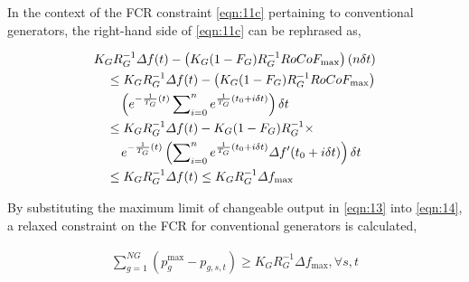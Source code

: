 \documentclass[lettersize,journal]{IEEEtran}
\begin{document}
In the context of the FCR constraint \eqref{eqn:11c} pertaining to conventional generators, the right-hand side of \eqref{eqn:11c} can be rephrased as,

\vspace{-0.125in}
\begin{small}
	\begin{align}\label{eqn:13}
		 & {{K_{G} }{ R_{G}^{-1}} \varDelta f(t) -  \left({K_G(1-F_G)}{ R_{G}^{-1} }RoCoF_{\text{max}}\right )\left( n\delta t \right)} \notag                                   \\
		 & \quad \leq {K_{G} }{ R_{G}^{-1}} \varDelta f(t) -  \left({K_G(1-F_G)}{ R_{G}^{-1} }RoCoF_{\text{max}} \right)\notag                                                   \\
		 & \qquad \left( e^{-\frac{1}{T_G} (t)}\sum\nolimits_{i = 0}^{n}e^{\frac{1}{T_G}(t_0 + i \delta t)}  \right) \delta t\notag                                              \\
		 & \quad \leq {K_{G} }{ R_{G}^{-1}} \varDelta f(t)- {K_G(1-F_G)}{ R_{G}^{-1} }\times \notag                                                                              \\
		 & \quad \quad\, e^{-\frac{1}{T_G} (t)}\left(\sum\nolimits_{i = 0}^{n}e^{\frac{1}{T_G}(t_0 + i \delta t)} \varDelta f^{\prime}(t_0 + i \delta t) \right) \delta t \notag \\
		 & \quad \leq {K_{G} }{ R_{G}^{-1}} \varDelta f(t) \leq {{K_{G} }{ R_{G}^{-1}} \varDelta f_{\text{max}}}
	\end{align}
\end{small}

By substituting the maximum limit of changeable output in \eqref{eqn:13} into \eqref{eqn:14}, a relaxed constraint on the FCR for conventional generators is calculated,

\vspace{-0.115in}
\begin{small}
	\begin{align}\label{eqn:14}
		\sum\nolimits_{g=1}^{NG} \left( p_{g}^{\text{max}} - p_{g, s, t}\right)\geq {{K_{G} }{ R_{G}^{-1}} \varDelta f_{\text{max}}}, \forall s,t
	\end{align}
\end{small}
\end{document}
